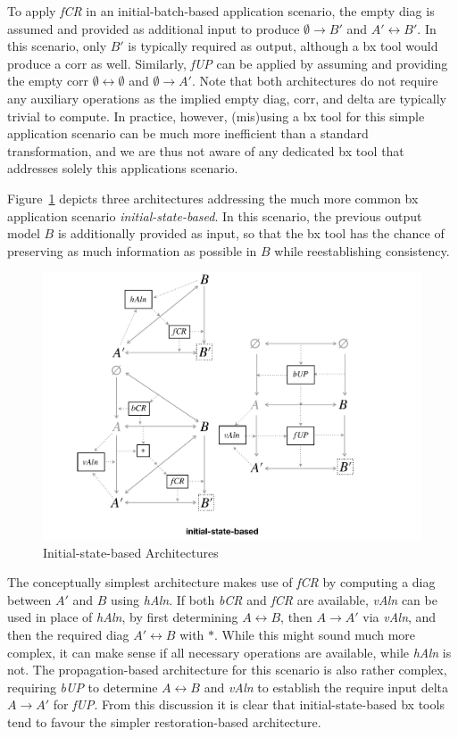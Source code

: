 %
To apply \emph{fCR} in an initial-batch-based application scenario, the empty diag is assumed and provided as additional input to produce $\emptyset \rightarrow B'$ and $A' \leftrightarrow B'$.
In this scenario, only $B'$ is typically required as output, although a bx tool would produce a corr as well.
%
Similarly, \emph{fUP} can be applied by assuming and providing the empty corr $\emptyset \leftrightarrow \emptyset$ and $\emptyset \rightarrow A'$.
%
Note that both architectures do not require any auxiliary operations as the implied empty diag, corr, and delta are typically trivial to compute.
In practice, however, (mis)using a bx tool for this simple application scenario can be much more inefficient than a standard transformation, and we are thus not aware of any dedicated bx tool that addresses solely this applications scenario. 

Figure~\ref{fig:initialStateBased} depicts three architectures addressing the much more common bx application scenario \emph{initial-state-based}.
In this scenario, the previous output model $B$ is additionally provided as input, so that the bx tool has the chance of preserving as much information as possible in $B$ while reestablishing consistency.
%
\begin{figure}[tb!]
	\centering
	\includegraphics[width=\columnwidth]{diagrams/foundations//initial-state-based}
	\caption{Initial-state-based Architectures}
	\label{fig:initialStateBased}
\end{figure}
%
The conceptually simplest architecture makes use of \emph{fCR} by computing a diag between $A'$ and $B$ using \emph{hAln}.
%
If both \emph{bCR} and \emph{fCR} are available, \emph{vAln} can be used in place of \emph{hAln}, by first determining $A \leftrightarrow B$, then $A \rightarrow A'$ via \emph{vAln}, and then the required diag $A' \leftrightarrow B$ with $\ast$.
While this might sound much more complex, it can make sense if all necessary operations are available, while \emph{hAln} is not.
%
The propagation-based architecture for this scenario is also rather complex, requiring \emph{bUP} to determine $A \leftrightarrow B$ and \emph{vAln} to establish the require input delta $A \rightarrow A'$ for \emph{fUP}.
%
From this discussion it is clear that initial-state-based bx tools tend to favour the simpler restoration-based architecture.

